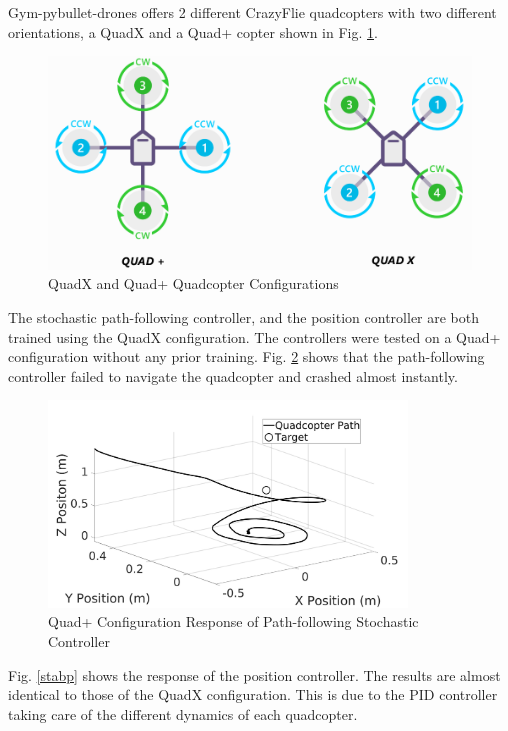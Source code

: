     Gym-pybullet-drones offers 2 different CrazyFlie quadcopters with two different orientations, a QuadX and a Quad+ copter shown in Fig. \ref{quads}.
    \begin{figure}[H]
            \centering
            \includegraphics[width=0.8\linewidth]{Images/Quad.png}
            \caption{QuadX and Quad+ Quadcopter Configurations \cite{arducopter}}
            \label{quads}
    \end{figure}\clearpage
    The stochastic path-following controller, and the position controller are both trained using the QuadX configuration. The controllers were tested on a Quad+ configuration without any prior training. Fig. \ref{psac} shows that the path-following controller failed to navigate the quadcopter and crashed almost instantly.
    \begin{figure}[H]
            \centering
            \includegraphics[width=0.85\textwidth]{plots/p_crash.jpg}
            \caption{Quad+ Configuration Response of Path-following Stochastic Controller}
            \label{psac}
    \end{figure}
    Fig. \ref{stabp} shows the response of the position controller. The results are almost identical to those of the QuadX configuration. This is due to the PID controller taking care of the different dynamics of each quadcopter.
